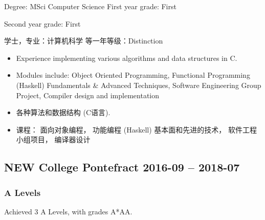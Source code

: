 \begin{xen}
        Degree: MSci Computer Science
        \hfill
        First year grade: First\\
        {\raggedleft Second year grade: First\par}
\end{xen}
\begin{xcn}
        学士，专业：计算机科学
        \hfill
        等一年等级：Distinction\\
        {}
\end{xcn}
\begin{xen}
        \begin{itemize}
            \item Experience implementing various algorithms and data structures in
                C.
            \item Modules include:
Object Oriented Programming,
Functional Programming (Haskell) \textendash{} Fundamentals \& Advanced Techniques,
Software Engineering Group Project,
Compiler design and implementation
        \end{itemize}
\end{xen}
\begin{xcn} %
        \begin{itemize}
            \item 各种算法和数据结构 (C语言).
            \item 课程：
面向对象编程，
功能编程 (Haskell) \textendash{} 基本面和先进的技术，
软件工程小组项目，
编译器设计
        \end{itemize}
\end{xcn}
\begin{xen}
    \subsection{NEW College Pontefract
        \hfill 2016-09 -- 2018-07}
        \subsubsection{A Levels}
            Achieved 3 A Levels, with grades A*AA.
\end{xen}
